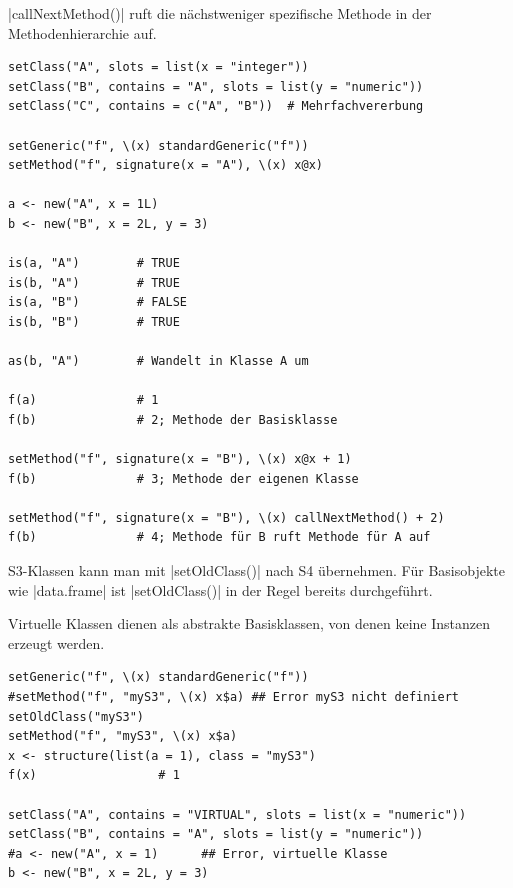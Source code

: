 \documentclass[10pt,twocolumn]{scrartcl}
\renewcommand{\lstinline}{\mycoloredinline}
\begin{document}
\lstinline|callNextMethod()| ruft die nächstweniger spezifische Methode in der Methodenhierarchie auf.

\begin{lstlisting}
setClass("A", slots = list(x = "integer"))
setClass("B", contains = "A", slots = list(y = "numeric"))
setClass("C", contains = c("A", "B"))  # Mehrfachvererbung

setGeneric("f", \(x) standardGeneric("f"))
setMethod("f", signature(x = "A"), \(x) x@x)

a <- new("A", x = 1L)
b <- new("B", x = 2L, y = 3)

is(a, "A")        # TRUE
is(b, "A")        # TRUE
is(a, "B")        # FALSE
is(b, "B")        # TRUE

as(b, "A")        # Wandelt in Klasse A um

f(a)              # 1
f(b)              # 2; Methode der Basisklasse

setMethod("f", signature(x = "B"), \(x) x@x + 1)
f(b)              # 3; Methode der eigenen Klasse

setMethod("f", signature(x = "B"), \(x) callNextMethod() + 2)
f(b)              # 4; Methode für B ruft Methode für A auf
\end{lstlisting}

S3-Klassen kann man mit \lstinline|setOldClass()| nach S4 übernehmen. Für Basisobjekte wie \lstinline|data.frame| ist \lstinline|setOldClass()| in der Regel bereits durchgeführt.

Virtuelle Klassen dienen als abstrakte Basisklassen, von denen keine Instanzen erzeugt werden.

\begin{lstlisting}
setGeneric("f", \(x) standardGeneric("f"))
#setMethod("f", "myS3", \(x) x$a) ## Error myS3 nicht definiert
setOldClass("myS3")
setMethod("f", "myS3", \(x) x$a)
x <- structure(list(a = 1), class = "myS3")
f(x)                 # 1

setClass("A", contains = "VIRTUAL", slots = list(x = "numeric"))
setClass("B", contains = "A", slots = list(y = "numeric"))
#a <- new("A", x = 1)      ## Error, virtuelle Klasse
b <- new("B", x = 2L, y = 3)
\end{lstlisting}


\end{document}
